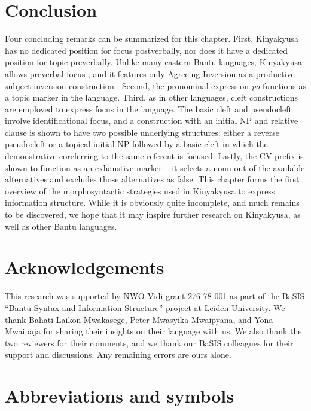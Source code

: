 \documentclass[output=paper]{langscibook}
\begin{document}
\section{Conclusion}\largerpage

Four concluding remarks can be summarized for this chapter. First, Kinyakyusa has no dedicated position for focus postverbally, nor does it have a dedicated position for topic preverbally. Unlike many eastern Bantu languages, Kinyakyusa allows preverbal focus \citep[see][]{KerrEtAl2023}, and it features only Agreeing Inversion as a productive subject inversion construction \citep[see][]{MsovelaEtAl2023}.  Second, the pronominal expression \textit{po} functions as a topic marker in the language. Third, as in other languages, cleft constructions are employed to express focus in the language. The basic cleft and pseudocleft involve identificational focus, and a construction with an initial NP and relative clause is shown to have two possible underlying structures: either a reverse pseudocleft or a topical initial NP followed by a basic cleft in which the demonstrative coreferring to the same referent is focused. Lastly, the CV prefix is shown to function as an exhaustive marker \citep[see][]{vanderWalLusekelo2022} – it selects a noun out of the available alternatives and excludes those alternatives as false. This chapter forms the first overview of the morphosyntactic strategies used in Kinyakyusa to express information structure. While it is obviously quite incomplete, and much remains to be discovered, we hope that it may inspire further research on Kinyakyusa, as well as other Bantu languages.

\section*{Acknowledgements}

This research was supported by NWO Vidi grant 276-78-001 as part of the BaSIS “Bantu Syntax and Information Structure” project at Leiden University. We thank Bahati Laikon Mwakasege, Peter Mwasyika Mwaipyana, and Yona Mwaipaja for sharing their insights on their language with us. We also thank the two reviewers for their comments, and we thank our BaSIS colleagues for their support and discussions. Any remaining errors are ours alone.

\section*{Abbreviations and symbols}
\end{document}
